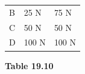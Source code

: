 \begin{enumerate}[noitemsep, label=\textbf{\arabic*}. ]
{{\begin{center}
\begin{tabular}[t]{|l|l|l|}
        B &
    
    
        25 N &
    
    
        75 N%
     \tabularnewline\cline{1-1}\cline{2-2}\cline{3-3}
    
    
        C &
    
    
        50 N &
    
    
        50 N%
     \tabularnewline\cline{1-1}\cline{2-2}\cline{3-3}
    
    
        D &
    
    
        100 N &
    
    
        100 N%
     \tabularnewline\cline{1-1}\cline{2-2}\cline{3-3}
    \end{tabular}
      \end{center}
    \begin{center}{\small\bfseries Table 19.10}\end{center}
    
}}
\end{enumerate}
